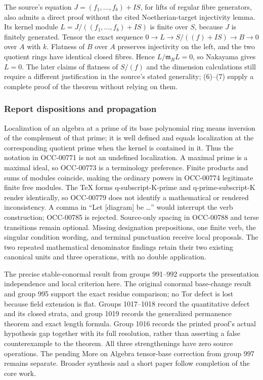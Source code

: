 The source's equation \(J=(f_1,\ldots,f_b)+IS\), for lifts of regular fibre generators, also admits a direct proof without the cited Noetherian-target injectivity lemma. Its kernel module \(L=J/((f_1,\ldots,f_b)+IS)\) is finite over \(S\), because \(J\) is finitely generated. Tensor the exact sequence \(0\to L\to S/((f)+IS)\to B\to0\) over \(A\) with \(k\). Flatness of \(B\) over \(A\) preserves injectivity on the left, and the two quotient rings have identical closed fibres. Hence \(L/\mathfrak m_RL=0\), so Nakayama gives \(L=0\). The later claims of flatness of \(S/(f)\) and the dimension calculations still require a different justification in the source's stated generality; (6)--(7) supply a complete proof of the theorem without relying on them.

\subsubsection{Report dispositions and propagation}\label{report-dispositions-and-propagation}

Localization of an algebra at a prime of its base polynomial ring means inversion of the complement of that prime; it is well defined and equals localization at the corresponding quotient prime when the kernel is contained in it. Thus the notation in OCC-00771 is not an undefined localization. A maximal prime is a maximal ideal, so OCC-00773 is a terminology preference. Finite products and sums of modules coincide, making the ordinary powers in OCC-00774 legitimate finite free modules. The TeX forms q-subscript-K-prime and q-prime-subscript-K render identically, so OCC-00779 does not identify a mathematical or rendered inconsistency. A comma in ``Let {[}diagram{]} be \ldots'' would interrupt the verb construction; OCC-00785 is rejected. Source-only spacing in OCC-00788 and terse transitions remain optional. Missing designation prepositions, one finite verb, the singular condition wording, and terminal punctuation receive local proposals. The two repeated mathematical denominator findings retain their two existing canonical units and three operations, with no double application.

The precise stable-conormal result from groups 991--992 supports the presentation independence and local criterion here. The original conormal base-change result and group 995 support the exact residue comparison; no Tor defect is lost because field extension is flat. Groups 1017--1018 record the quantitative defect and its closed strata, and group 1019 records the generalized permanence theorem and exact length formula. Group 1016 records the printed proof's actual hypothesis gap together with its full resolution, rather than asserting a false counterexample to the theorem. All three strengthenings have zero source operations. The pending More on Algebra tensor-base correction from group 997 remains separate. Broader synthesis and a short paper follow completion of the core work.
